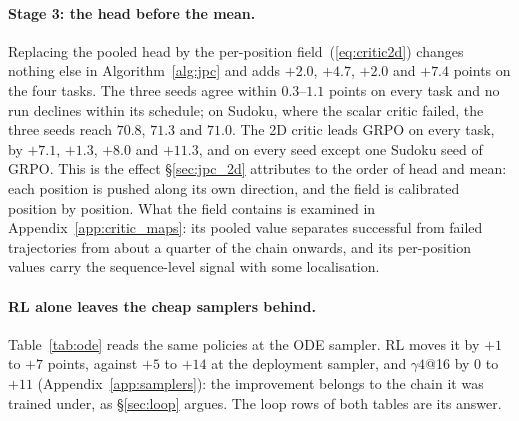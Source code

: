 \paragraph{Stage 3: the head before the mean.}
Replacing the pooled head by the per-position field~(\ref{eq:critic2d}) changes nothing else in Algorithm~\ref{alg:jpc} and adds $+2.0$, $+4.7$, $+2.0$ and $+7.4$ points on the four tasks. The three seeds agree within $0.3$--$1.1$ points on every task and no run declines within its schedule; on Sudoku, where the scalar critic failed, the three seeds reach $70.8$, $71.3$ and $71.0$. The 2D critic leads GRPO on every task, by $+7.1$, $+1.3$, $+8.0$ and $+11.3$, and on every seed except one Sudoku seed of GRPO. This is the effect \S\ref{sec:jpc_2d} attributes to the order of head and mean: each position is pushed along its own direction, and the field is calibrated position by position. What the field contains is examined in Appendix~\ref{app:critic_maps}: its pooled value separates successful from failed trajectories from about a quarter of the chain onwards, and its per-position values carry the sequence-level signal with some localisation.

\paragraph{RL alone leaves the cheap samplers behind.}
Table~\ref{tab:ode} reads the same policies at the ODE sampler. RL moves it by $+1$ to $+7$ points, against $+5$ to $+14$ at the deployment sampler, and $\gamma4$@16 by $0$ to $+11$ (Appendix~\ref{app:samplers}): the improvement belongs to the chain it was trained under, as \S\ref{sec:loop} argues. The loop rows of both tables are its answer.

